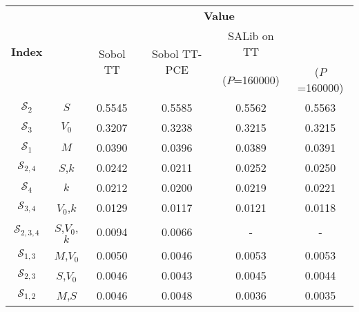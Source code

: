 
    \begin{tabular}{|c|c|cccc|}
        \hline
        \multicolumn{1}{|c|}{\multirow{3}{*}{\textbf{Index}}} & {\multirow{3}{*}{\textbf{Var(s)}}} & \multicolumn{4}{c|}{\textbf{Value}} \\ \cline{ 3-6 }
        \multicolumn{1}{|c|}{} &  & \multicolumn{1}{|c}{\multirow{2}{*}{Sobol TT}} & \multicolumn{1}{|c}{\multirow{2}{*}{Sobol TT-PCE}} & \multicolumn{1}{|c}{SALib on TT} & \multicolumn{1}{|c|}{{\multirow{ 1 }{*}{ SALib }}} \\ %
        \multicolumn{1}{|c|}{} &  & \multicolumn{1}{|c}{} & \multicolumn{1}{|c}{}  & \multicolumn{1}{|c}{ ($P$=160000) } & \multicolumn{1}{|c|}{ ($P$=160000) } \\ \hline\hline
   
            $\mathcal{S}_{ 2 }$ & $S$ & 0.5545 & 0.5585 & 0.5562 & 0.5563 \\

            $\mathcal{S}_{ 3 }$ & $V_0$ & 0.3207 & 0.3238 & 0.3215 & 0.3215 \\

            $\mathcal{S}_{ 1 }$ & $M$ & 0.0390 & 0.0396 & 0.0389 & 0.0391 \\

            $\mathcal{S}_{ 2,4 }$ & $S$,$k$ & 0.0242 & 0.0211 & 0.0252 & 0.0250 \\

            $\mathcal{S}_{ 4 }$ & $k$ & 0.0212 & 0.0200 & 0.0219 & 0.0221 \\

            $\mathcal{S}_{ 3,4 }$ & $V_0$,$k$ & 0.0129 & 0.0117 & 0.0121 & 0.0118 \\

            $\mathcal{S}_{ 2,3,4 }$ & $S$,$V_0$,$k$ & 0.0094 & 0.0066 & - & - \\

            $\mathcal{S}_{ 1,3 }$ & $M$,$V_0$ & 0.0050 & 0.0046 & 0.0053 & 0.0053 \\

            $\mathcal{S}_{ 2,3 }$ & $S$,$V_0$ & 0.0046 & 0.0043 & 0.0045 & 0.0044 \\

            $\mathcal{S}_{ 1,2 }$ & $M$,$S$ & 0.0046 & 0.0048 & 0.0036 & 0.0035 \\

        \hline
        \end{tabular}